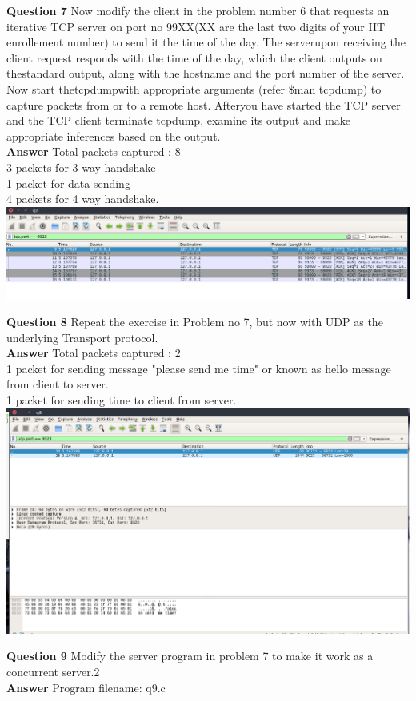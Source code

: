 \documentclass[14pt]{extarticle}
\begin{document}
    \noindent
    \textbf{\large Question 7}
    Now modify the client in the problem number 6 that requests an iterative TCP server on port no 99XX(XX are the last two digits of your IIT enrollement number) to send it the time of the day.
    The serverupon  receiving  the  client  request  responds  with  the  time  of  the  day,  which  the  client  outputs  on  thestandard output, along with the hostname and the port number of the server. 
    Now start thetcpdumpwith appropriate arguments (refer \$man tcpdump) to capture packets from or to a remote host.  Afteryou have started the TCP server and the TCP client terminate tcpdump, 
    examine its output and make appropriate inferences based on the output.\\[10pt]
    \textbf{\large Answer}
    Total packets captured : 8\\
    3 packets for 3 way handshake\\
    1 packet for data sending\\
    4 packets for 4 way handshake.\\[10pt]
    \includegraphics[scale=0.35]{images/q7.png}
    \vspace{1cm}

    \noindent
    \textbf{\large Question 8}
    Repeat the exercise in Problem no 7, but now with UDP as the underlying Transport protocol.\\[10pt]
    \textbf{\large Answer}
    Total packets captured : 2\\
    1 packet for sending message "please send me time" or known as hello message from client to server.\\
    1 packet for sending time to client from server.\\[10pt]
    \includegraphics[scale=0.35]{images/q8.png}
    \vspace{1cm}

    \noindent
    \textbf{\large Question 9}
    Modify the server program in problem 7 to make it work as a concurrent server.2\\[10pt]
    \textbf{\large Answer}
    Program filename: q9.c
    \vspace{1cm}
\end{document}
